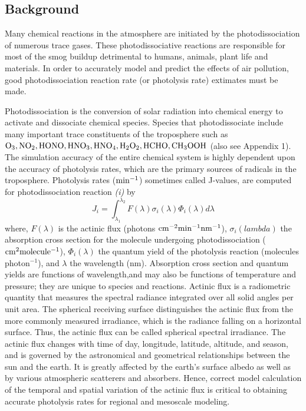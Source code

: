 \subsection{Background}
Many chemical reactions in the atmosphere are initiated by the 
photodissociation of numerous trace gases. These photodissociative reactions are
responsible for most of the smog buildup detrimental to humans, animals, plant 
life and materials. In order to accurately model and predict the effects of air pollution, good photodissociation reaction rate (or photolysis rate) extimates 
must be made. 

Photodissociation is the conversion of solar radiation into chemical energy 
to activate and dissociate chemical species. 
Species that photodissociate include 
many important trace constituents of the troposphere such as $\rm O_3, NO_2, 
HONO, HNO_3, HNO_4, H_2O_2, HCHO, CH_3OOH$ (also see Appendix 1).  The 
simulation accuracy of the entire chemical system is highly dependent upon the
accuracy of photolysis rates, which are the primary sources of radicals in the 
troposphere. Photolysis rates ($\rm min^{-1}$) sometimes called J-values, are 
computed for photodissociation reaction {\it (i)} by
$$
J_i = \int_{\lambda_1}^{\lambda_2} F(\lambda) \sigma_i(\lambda) \Phi_i(\lambda) d\lambda
$$
where, $F(\lambda)$ is the actinic flux (photons $\rm cm^{-2} min^{-1} nm^{-1}$), $\sigma_i(lambda)$ the absorption cross section for the molecule undergoing 
photodissociation ($\rm cm^2 molecule^{-1}$), $\Phi_i(\lambda)$ the quantum 
yield of the photolysis reaction (molecules photon$^{-1}$), and $\lambda$ the 
wavelength (nm). Absorption cross section and quantum yields are functions of 
wavelength,and may also be functions of temperature and pressure; they are 
unique to species and reactions.  Actinic flux is a radiometric quantity that 
measures the spectral radiance integrated over all solid angles per unit area. 
The spherical receiving surface distinguishes the actinic flux from the more 
commonly measured irradiance, which is the radiance falling on a horizontal 
surface. Thus, the actinic flux can be called spherical spectral irradiance. 
The actinic flux changes with time of day, longitude, latitude, altitude, 
and season, and is governed by the astronomical and geometrical relationships 
between the sun and the earth. It is greatly affected by the earth's surface 
albedo as well as by various atmospheric scatterers and absorbers. Hence, 
correct model calculation of the temporal and spatial variation of the 
actinic flux is critical to obtaining accurate photolysis rates for regional 
and mesoscale modeling. 

